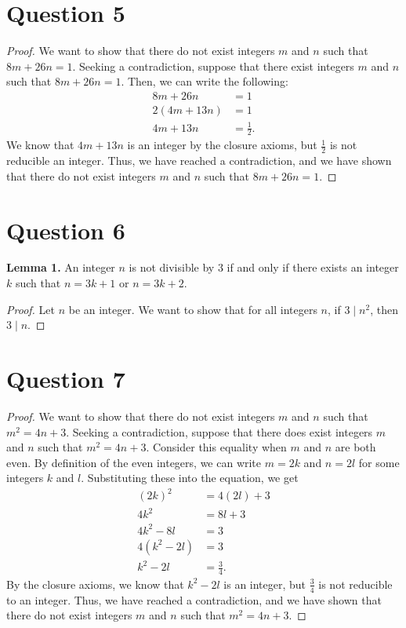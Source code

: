 \documentclass{article}
\begin{document}
\section*{Question 5}
\begin{proof}
    We want to show that there do not exist integers $m$ and $n$ such that $8m + 26n = 1$.
    Seeking a contradiction, suppose that there exist integers $m$ and $n$ such that $8m + 26n = 1$.
    Then, we can write the following:
    \begin{align*}
        8m + 26n &= 1 \\
        2(4m + 13n) &= 1 \\
        4m + 13n &= \frac{1}{2}.
    \end{align*}
    We know that $4m + 13n$ is an integer by the closure axioms, but $\frac{1}{2}$ is not reducible an integer.
    Thus, we have reached a contradiction, and we have shown that there do not exist integers $m$ and $n$ such that $8m + 26n = 1$.
\end{proof}

\section*{Question 6}
\textbf{Lemma 1.} An integer $n$ is not divisible by 3 if and only if there exists an integer $k$ such that $n = 3k + 1$ or $n = 3k + 2$.
\begin{proof}
    Let $n$ be an integer.
    We want to show that for all integers $n$, if $3 \mid n^2$, then $3 \mid n$.
\end{proof}

\section*{Question 7}
\begin{proof}
    We want to show that there do not exist integers $m$ and $n$ such that $m^2 = 4n + 3$.
    Seeking a contradiction, suppose that there does exist integers $m$ and $n$ such that $m^2 = 4n + 3$.
    Consider this equality when $m$ and $n$ are both even.
    By definition of the even integers, we can write $m = 2k$ and $n = 2l$ for some integers $k$ and $l$.
    Substituting these into the equation, we get
    \begin{align*}
        (2k)^2 &= 4(2l) + 3 \\
        4k^2 &= 8l + 3 \\
        4k^2 - 8l &= 3 \\
        4(k^2 - 2l) &= 3 \\
        k^2 - 2l &= \frac{3}{4}.
    \end{align*}
    By the closure axioms, we know that $k^2 - 2l$ is an integer, but $\frac{3}{4}$ is not reducible to an integer.
    Thus, we have reached a contradiction, and we have shown that there do not exist integers $m$ and $n$ such that $m^2 = 4n + 3$.
\end{proof}
\end{document}

